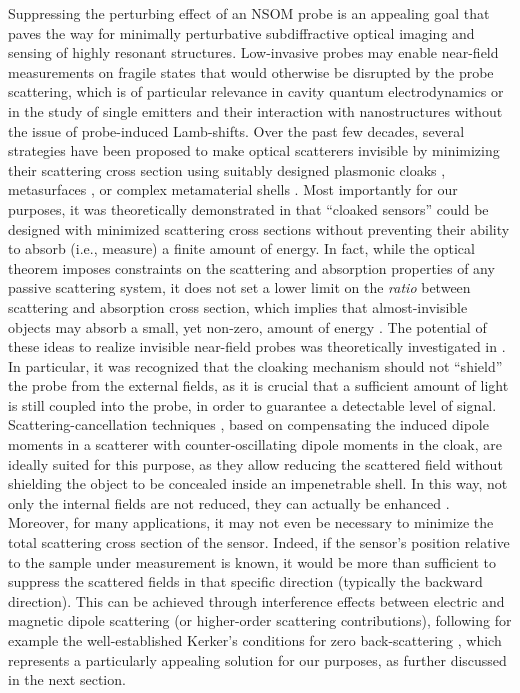 \documentclass{osa-article}
\begin{document}
	Suppressing the perturbing effect of an NSOM probe is an appealing goal that paves the way for minimally perturbative subdiffractive optical imaging and sensing of highly resonant structures. Low-invasive probes may enable near-field measurements on fragile states that would otherwise be disrupted by the probe scattering, which is of particular relevance in cavity quantum electrodynamics or in the study of single emitters and their interaction with nanostructures without the issue of probe-induced Lamb-shifts. Over the past few decades, several strategies have been proposed to make optical scatterers invisible by minimizing their scattering cross section \cite{Fleury_2015} using suitably designed plasmonic cloaks \cite{Kerker_1975, Alu_2008}, metasurfaces \cite{Estakhri_2014,Ni_2015}, or complex metamaterial shells \cite{Schurig_06,Alu_2005,Valentine_2009,Soric_14,chen2019active}. Most importantly for our purposes, it was theoretically demonstrated in \cite{Alu_2009} that ``cloaked sensors'' could be designed with minimized scattering cross sections without preventing their ability to absorb (i.e., measure) a finite amount of energy. In fact, while the optical theorem imposes constraints on the scattering and absorption properties of any passive scattering system, it does not set a lower limit on the \textit{ratio} between scattering and absorption cross section, which implies that almost-invisible objects may absorb a small, yet non-zero, amount of energy \cite{Soric_14,Fleury_14}. The potential of these ideas to realize invisible near-field probes was theoretically investigated in \cite{Alu_2010,Chen_2017}. In particular, it was recognized that the cloaking mechanism should not ``shield'' the probe from the external fields, as it is crucial that a sufficient amount of light is still coupled into the probe, in order to guarantee a detectable level of signal. Scattering-cancellation techniques \cite{Alu_2005,Alu_2008,Alu_2009,Alu_2010}, based on compensating the induced dipole moments in a scatterer with counter-oscillating dipole moments in the cloak, are ideally suited for this purpose, as they allow reducing the scattered field without shielding the object to be concealed inside an impenetrable shell. In this way, not only the internal fields are not reduced, they can actually be enhanced \cite{Alu_2009,Monticone_2014}. Moreover, for many applications, it may not even be necessary to minimize the total scattering cross section of the sensor. Indeed, if the sensor's position relative to the sample under measurement is known, it would be more than sufficient to suppress the scattered fields in that specific direction (typically the backward direction). This can be achieved through interference effects between electric and magnetic dipole scattering (or higher-order scattering contributions), following for example the well-established Kerker's conditions for zero back-scattering \cite{Kerker_1975,Alukerker_2010,picardi2018janus,picardi2019experimental}, which represents a particularly appealing solution for our purposes, as further discussed in the next section. \par
\end{document}

